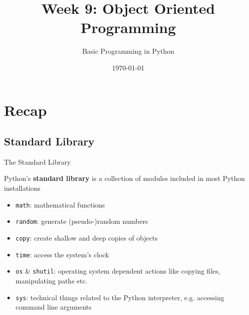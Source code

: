 



\title[Object Oriented Programming]{Week 9: Object Oriented Programming}
\subtitle{Basic Programming in Python}

\date{\today}

\begin{frame}[plain]
     \titlepage
\end{frame}

\begin{frame}
    \tableofcontents
\end{frame}

\section{Recap}

\subsection{Standard Library}

\begin{frame}{The Standard Library}

    Python's {\bf standard library} is a collection of modules included in most Python installations

    \begin{itemize}
        \item {\tt math}: mathematical functions
        \item {\tt random}: generate (pseudo-)random numbers
        \item {\tt copy}: create shallow and deep copies of objects
        \item {\tt time}: access the system's clock
        \item {\tt os} \& {\tt shutil}: operating system dependent actions like copying files, manipulating paths etc.
        \item {\tt sys}: technical things related to the Python interpreter, e.g. accessing command line arguments
    \end{itemize}


\end{frame}

